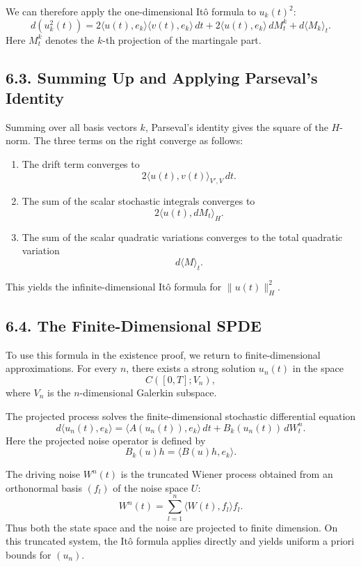 \documentclass[11pt]{article}
\theoremstyle{definition}
\theoremstyle{remark}
\begin{document}
We can therefore apply the one-dimensional It\^o formula to \(u_k(t)^2\):
\[
d(u_k^2(t))
=
2\langle u(t),e_k\rangle\langle v(t),e_k\rangle\,dt
+
2\langle u(t),e_k\rangle\,dM_t^k
+
d\langle M_k\rangle_t.
\]
Here \(M_t^k\) denotes the \(k\)-th projection of the martingale part.

\subsection*{6.3. Summing Up and Applying Parseval's Identity}
Summing over all basis vectors \(k\), Parseval's identity gives the square of the \(H\)-norm. The three terms on the right converge as follows:

\begin{enumerate}
\item The drift term converges to
\[
2\langle u(t),v(t)\rangle_{V',V}\,dt.
\]

\item The sum of the scalar stochastic integrals converges to
\[
2\langle u(t),dM_t\rangle_H.
\]

\item The sum of the scalar quadratic variations converges to the total quadratic variation
\[
d\langle M\rangle_t.
\]
\end{enumerate}

This yields the infinite-dimensional It\^o formula for \(\|u(t)\|_H^2\).

\subsection*{6.4. The Finite-Dimensional SPDE}
To use this formula in the existence proof, we return to finite-dimensional approximations. For every \(n\), there exists a strong solution \(u_n(t)\) in the space
\[
C([0,T];V_n),
\]
where \(V_n\) is the \(n\)-dimensional Galerkin subspace.

The projected process solves the finite-dimensional stochastic differential equation
\[
d\langle u_n(t),e_k\rangle
=
\langle A(u_n(t)),e_k\rangle\,dt
+
B_k(u_n(t))\,dW_t^n.
\]
Here the projected noise operator is defined by
\[
B_k(u)h=\langle B(u)h,e_k\rangle.
\]

The driving noise \(W^n(t)\) is the truncated Wiener process obtained from an orthonormal basis \((f_l)\) of the noise space \(U\):
\[
W^n(t)=\sum_{l=1}^n \langle W(t),f_l\rangle f_l.
\]
Thus both the state space and the noise are projected to finite dimension. On this truncated system, the It\^o formula applies directly and yields uniform a priori bounds for \((u_n)\).
\end{document}
